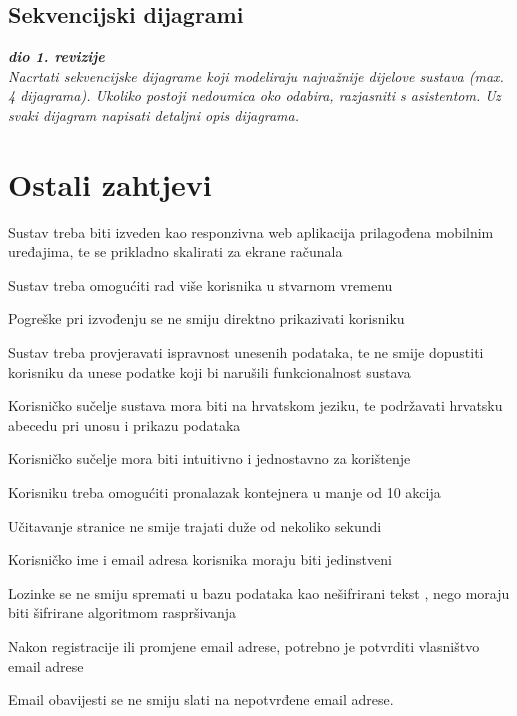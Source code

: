			\subsection{Sekvencijski dijagrami}

			\textbf{\textit{dio 1. revizije}}\\
			
			\textit{Nacrtati sekvencijske dijagrame koji modeliraju najvažnije dijelove sustava (max. 4 dijagrama). Ukoliko postoji nedoumica oko odabira, razjasniti s asistentom. Uz svaki dijagram napisati detaljni opis dijagrama.}
			\eject

			\section{Ostali zahtjevi}

			\begin{packed_item}
				\item Sustav treba biti izveden kao responzivna web aplikacija prilagođena mobilnim uređajima, te se prikladno skalirati za ekrane računala
				\item Sustav treba omogućiti rad više korisnika u stvarnom vremenu
				\item Pogreške pri izvođenju se ne smiju direktno prikazivati korisniku
				\item Sustav treba provjeravati ispravnost unesenih podataka, te ne smije dopustiti korisniku da unese podatke koji bi narušili funkcionalnost sustava
				\item Korisničko sučelje sustava mora biti na hrvatskom jeziku, te podržavati hrvatsku abecedu pri unosu i prikazu podataka
				\item Korisničko sučelje mora biti intuitivno i jednostavno za korištenje
				\item Korisniku treba omogućiti pronalazak kontejnera u manje od 10 akcija
				\item Učitavanje stranice ne smije trajati duže od nekoliko sekundi
				\\
				\item Korisničko ime i email adresa korisnika moraju biti jedinstveni
				\item Lozinke se ne smiju spremati u bazu podataka kao nešifrirani tekst , nego moraju biti šifrirane algoritmom raspršivanja
				\item Nakon registracije ili promjene email adrese, potrebno je potvrditi vlasništvo email adrese
				\item Email obavijesti se ne smiju slati na nepotvrđene email adrese.
			\end{packed_item}
